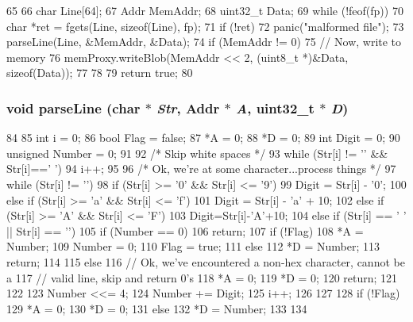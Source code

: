 \begin{DoxyCode}
65 {
66     char Line[64];
67     Addr MemAddr;
68     uint32_t Data;
69     while (!feof(fp)) {
70         char *ret = fgets(Line, sizeof(Line), fp);
71         if (!ret)
72             panic("malformed file");
73         parseLine(Line, &MemAddr, &Data);
74         if (MemAddr != 0) {
75             // Now, write to memory
76             memProxy.writeBlob(MemAddr << 2, (uint8_t *)&Data, sizeof(Data));
77         }
78     }
79     return true;
80 }
\end{DoxyCode}
\hypertarget{classHexFile_a391ff17c7683a3c9967247e7550897c9}{
\subsubsection[{parseLine}]{\setlength{\rightskip}{0pt plus 5cm}void parseLine (char $\ast$ {\em Str}, \/  {\bf Addr} $\ast$ {\em A}, \/  {\bf uint32\_\-t} $\ast$ {\em D})}}
\label{classHexFile_a391ff17c7683a3c9967247e7550897c9}



\begin{DoxyCode}
84 {
85     int i = 0;
86     bool Flag = false;
87     *A = 0;
88     *D = 0;
89     int Digit = 0;
90     unsigned Number = 0;
91 
92     /* Skip white spaces */
93     while (Str[i] != '\0' && Str[i]==' ')
94         i++;
95 
96     /* Ok, we're at some character...process things */
97     while (Str[i] != '\0') {
98         if (Str[i] >= '0' && Str[i] <= '9') {
99             Digit = Str[i] - '0';
100         } else if (Str[i] >= 'a' && Str[i] <= 'f') {
101             Digit = Str[i] - 'a' + 10;
102         } else if (Str[i] >= 'A' && Str[i] <= 'F') {
103           Digit=Str[i]-'A'+10;
104         } else if (Str[i] == ' ' || Str[i] == '\n') {
105             if (Number == 0)
106                 return;
107             if (!Flag) {
108                 *A = Number;
109                 Number = 0;
110                 Flag = true;
111             } else {
112                 *D = Number;
113                 return;
114             }
115         } else {
116             // Ok, we've encountered a non-hex character, cannot be a
117             // valid line, skip and return 0's
118             *A = 0;
119             *D = 0;
120             return;
121         }
122 
123         Number <<= 4;
124         Number += Digit;
125         i++;
126     }
127 
128     if (!Flag) {
129         *A = 0;
130         *D = 0;
131     } else {
132         *D = Number;
133     }
134 }
\end{DoxyCode}


